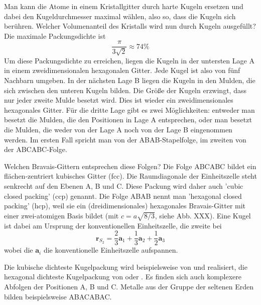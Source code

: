 Man kann die Atome in einem Kristallgitter durch harte Kugeln ersetzen und dabei den Kugeldurchmesser maximal wählen, also so, dass die Kugeln sich berühren. Welcher Volumenanteil des Kristalls wird nun durch Kugeln ausgefüllt? Die maximale Packungsdichte ist 
\begin{equation}
 \frac{\pi}{3 \sqrt{2}} \approx 74 \%
\end{equation}
Um diese Packungsdichte zu erreichen, liegen die Kugeln in der untersten Lage A in einem zweidimensionalen hexagonalen Gitter. Jede Kugel ist also von fünf Nachbarn umgeben. In der nächsten Lage B liegen die Kugeln in den Mulden, die sich zwischen den unteren Kugeln bilden.  Die Größe der Kugeln erzwingt, dass nur jeder zweite Mulde besetzt wird.
Dies ist wieder ein zweidimensionales hexagonales Gitter. Für die dritte Lage gibt es zwei Möglichkeiten: entweder man besetzt die Mulden, die den Positionen in Lage A entsprechen, oder man besetzt die Mulden, die weder von der Lage A noch von der Lage B eingenommen werden. Im ersten Fall spricht man von der ABAB-Stapelfolge, im zweiten von der ABCABC-Folge.

Welchen Bravais-Gittern entsprechen diese Folgen?  Die Folge ABCABC bildet ein flächen-zentriert kubisches Gitter (fcc).  Die Raumdiagonale der  Einheitszelle steht senkrecht auf den Ebenen A, B und C. Diese Packung wird daher auch 'cubic closed packing' (ccp) genannt. Die Folge ABAB nennt man  'hexagonal closed packing' (hcp), weil sie ein (dreidimensionales) hexagonales Bravais-Gitter mit einer zwei-atomigen Basis bildet (mit $c=a \sqrt{8/3}$, siehe Abb. XXX). Eine Kugel ist dabei am Ursprung der konventionellen Einheitszelle, die zweite bei 
\begin{equation}
 \mathbf{r}_{S_2} =  \frac{2}{3}  \mathbf{a}_1 + \frac{1}{3}  \mathbf{a}_2 + \frac{1}{2}  \mathbf{a}_3  
\end{equation}
 wobei die $\mathbf{a}_i$ die konventionelle Einheitszelle aufspannen.

Die kubische dichteste Kugelpackung wird beispielsweise von  und  realisiert, die hexagonal dichteste Kugelpackung von  oder . Es finden sich auch komplexere Abfolgen der Positionen A, B und C. Metalle aus der Gruppe der seltenen Erden bilden beispielsweise ABACABAC.






\printbibliography[segment=\therefsegment,heading=subbibliography]
